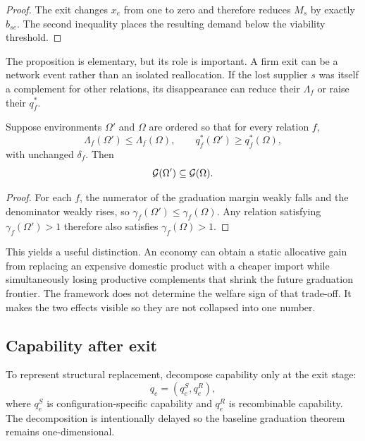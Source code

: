 \begin{proof}
The exit changes $x_e$ from one to zero and therefore reduces $M_s$ by exactly $b_{se}$. The second inequality places the resulting demand below the viability threshold.
\end{proof}

The proposition is elementary, but its role is important. A firm exit can be a network event rather than an isolated reallocation. If the lost supplier $s$ was itself a complement for other relations, its disappearance can reduce their $\Lambda_f$ or raise their $q_f^*$.

\begin{proposition}
\label{prop:frontier-contraction}
Suppose environments $\Omega'$ and $\Omega$ are ordered so that for every relation $f$,
\[
\Lambda_f(\Omega')\le\Lambda_f(\Omega),
\qquad
q_f^*(\Omega')\ge q_f^*(\Omega),
\]
with unchanged $\delta_f$. Then
\[
\mathcal{G}(\Omega')\subseteq\mathcal{G}(\Omega).
\]
\end{proposition}

\begin{proof}
For each $f$, the numerator of the graduation margin weakly falls and the denominator weakly rises, so $\gamma_f(\Omega')\le\gamma_f(\Omega)$. Any relation satisfying $\gamma_f(\Omega')>1$ therefore also satisfies $\gamma_f(\Omega)>1$.
\end{proof}

This yields a useful distinction. An economy can obtain a static allocative gain from replacing an expensive domestic product with a cheaper import while simultaneously losing productive complements that shrink the future graduation frontier. The framework does not determine the welfare sign of that trade-off. It makes the two effects visible so they are not collapsed into one number.

\subsection{Capability after exit}

To represent structural replacement, decompose capability only at the exit stage:
\begin{equation}
q_e=(q_e^S,q_e^R),
\end{equation}
where $q_e^S$ is configuration-specific capability and $q_e^R$ is recombinable capability. The decomposition is intentionally delayed so the baseline graduation theorem remains one-dimensional.

